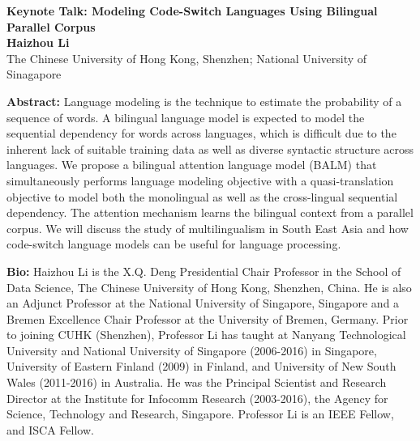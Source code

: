 \documentclass[11pt,oneside]{book}
\begin{document}
  \begin{center}
    {\LARGE \textbf{Keynote Talk: Modeling Code-Switch Languages Using Bilingual Parallel Corpus}\\}
    \vspace*{0.5cm}
    \textbf{Haizhou Li}\\
        The Chinese University of Hong Kong, Shenzhen; National University of Sinagapore\\
        
        
                
  \end{center}

  \vspace*{0.2cm}
    \textbf{Abstract:} Language modeling is the technique to estimate the probability of a sequence of words. A bilingual language model is expected to model the sequential dependency for words across languages, which is difficult due to the inherent lack of suitable training data as well as diverse syntactic structure across languages. We propose a bilingual attention language model (BALM) that simultaneously performs language modeling objective with a quasi-translation objective to model both the monolingual as well as the cross-lingual sequential dependency. The attention mechanism learns the bilingual context from a parallel corpus. We will discuss the study of multilingualism in South East Asia and how code-switch language models can be useful for language processing. \\
  \newline
  
    \textbf{Bio:} Haizhou Li is the X.Q. Deng Presidential Chair Professor in the School of Data Science, The Chinese University of Hong Kong, Shenzhen, China. He is also an Adjunct Professor at the National University of Singapore, Singapore and a Bremen Excellence Chair Professor at the University of Bremen, Germany. Prior to joining CUHK (Shenzhen), Professor Li has taught at Nanyang Technological University and National University of Singapore (2006-2016) in Singapore, University of Eastern Finland (2009) in Finland, and University of New South Wales (2011-2016) in Australia. He was the Principal Scientist and Research Director at the Institute for Infocomm Research (2003-2016), the Agency for Science, Technology and Research, Singapore. Professor Li is an IEEE Fellow, and ISCA Fellow.
\end{document}
